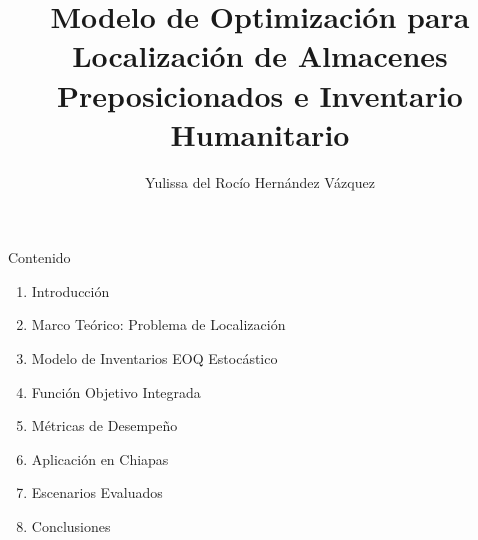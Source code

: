 \documentclass[
  ignorenonframetext,
]{beamer}
\title{Modelo de Optimización para Localización de Almacenes
Preposicionados e Inventario Humanitario}
\author{Yulissa del Rocío Hernández Vázquez}
\date{}
\providecommand{\tightlist}{%
  \setlength{\itemsep}{0pt}\setlength{\parskip}{0pt}}
\begin{document}
\frame{\titlepage}


\begin{frame}{Contenido}
\label{contenido}
\begin{enumerate}
\tightlist
\item
  Introducción
\item
  Marco Teórico: Problema de Localización
\item
  Modelo de Inventarios EOQ Estocástico
\item
  Función Objetivo Integrada
\item
  Métricas de Desempeño
\item
  Aplicación en Chiapas
\item
  Escenarios Evaluados
\item
  Conclusiones
\end{enumerate}
\end{frame}
\end{document}
